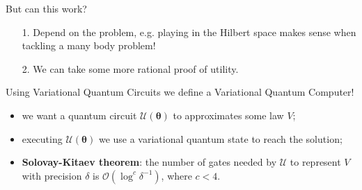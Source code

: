\documentclass[aspectratio=169, 10pt, xcolor={svgnames}, hyperref={linkcolor=black}]{beamer}
\begin{document}
\begin{frame}{But can this work?}
\pause
\begin{itemize}[noitemsep]
\item[1.] Depend on the problem\pause, e.g. playing in the Hilbert space
makes sense when tackling a many body problem!
\pause
\item[2.] We can take some more rational proof of utility.
\end{itemize}
\pause
Using Variational Quantum Circuits we define a Variational Quantum Computer!
\pause
\begin{multicols}{2}
\begin{itemize}[noitemsep]
\item<7,8,9>[1.] we want a quantum circuit $\mathcal{U}(\bm{\theta})$ to approximates some law $V$;
\item<8,9>[2.] executing $\mathcal{U}(\bm{\theta})$ we use a variational quantum state
to reach the solution;
\item<9>[3.] \textbf{Solovay-Kitaev theorem}: the number of gates needed by $\mathcal{U}$ to
represent $V$ with precision $\delta$ is $\mathcal{O}(\log^c \delta^{-1})$, where
$c<4$.
\end{itemize}
\begin{figure}
\end{figure}
\end{multicols}
\end{frame}
\end{document}
